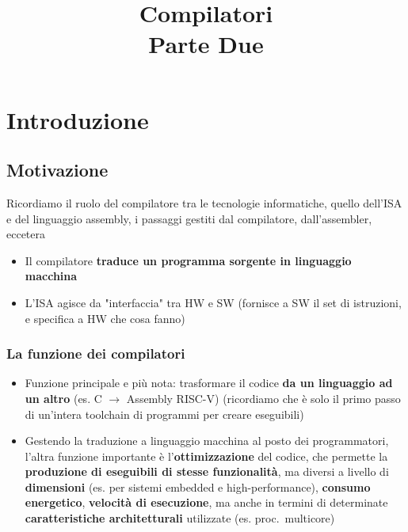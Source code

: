 

\title{%
  Compilatori\\
\large Parte Due}


\maketitle
\tableofcontents
\newpage
\section{Introduzione}

\subsection{Motivazione}

Ricordiamo il ruolo del compilatore tra le tecnologie informatiche, quello dell'ISA e del linguaggio assembly, i passaggi gestiti dal compilatore, dall'assembler, eccetera
\begin{itemize}
  \item Il compilatore \textbf{traduce un programma sorgente in linguaggio macchina}
  \item L'ISA agisce da "interfaccia" tra HW e SW (fornisce a SW il set di istruzioni, e specifica a HW che cosa fanno)
\end{itemize}

\subsubsection{La funzione dei compilatori}

\begin{itemize}
  \item Funzione principale e pi\`u nota: trasformare il codice \textbf{da un linguaggio ad un altro} (es. C $\rightarrow$ Assembly RISC-V) (ricordiamo che \`e solo il primo passo di un'intera toolchain di programmi per creare eseguibili)

  \item Gestendo la traduzione a linguaggio macchina al posto dei programmatori, l'altra funzione importante \`e l'\textbf{ottimizzazione} del codice, che permette la \textbf{produzione di eseguibili di stesse funzionalit\`a}, ma diversi a livello di \textbf{dimensioni} (es. per sistemi embedded e high-performance), \textbf{consumo energetico}, \textbf{velocit\`a di esecuzione}, ma anche in termini di determinate \textbf{caratteristiche architetturali} utilizzate (es. proc.~multicore)
\end{itemize}

